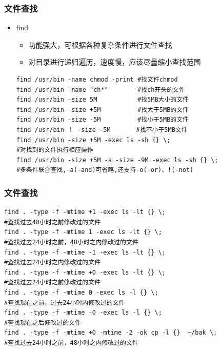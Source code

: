 \documentclass[xcolor=svgnames,presentation]{beamer}
\begin{document}
\begin{frame}[fragile]
\frametitle{文件查找}
\label{sec-1-1-7}
\begin{itemize}

\item find
\label{sec-1-1-7-1}%
\begin{itemize}

\item 功能强大，可根据各种复杂条件进行文件查找
\label{sec-1-1-7-1-1}%

\item 对目录进行递归遍历，速度慢，应该尽量缩小查找范围
\label{sec-1-1-7-1-2}%
\end{itemize} %
\label{sec-1-1-7-1-3}


\begin{verbatim}
find /usr/bin -name chmod -print #找文件chmod
find /usr/bin -name "ch*"        #找ch开头的文件
find /usr/bin -size 5M           #找5MB大小的文件
find /usr/bin -size +5M          #找大于5MB的文件
find /usr/bin -size -5M          #找小于5MB的文件
find /usr/bin ！ -size -5M       #找不小于5MB文件
find /usr/bin -size +5M -exec ls -sh {} \; 
#对找到的文件执行相应操作
find /usr/bin -size +5M -a -size -9M -exec ls -sh {} \; 
#多条件联合查找,-a(-and)可省略,还支持-o(-or)、!(-not)
\end{verbatim}
\end{itemize} %
\end{frame}
\begin{frame}[fragile]
\frametitle{文件查找}
\label{sec-1-1-8}
\label{sec-1-1-8-1}


\begin{verbatim}
find . -type -f -mtime +1 -exec ls -lt {} \; 
#查找过去48小时之前修改过的文件
find . -type -f -mtime 1 -exec ls -lt {} \;  
#查找过去24小时之前，48小时之内修改过的文件
find . -type -f -mtime -1 -exec ls -lt {} \; 
#查找过去24小时之内修改过的文件
find . -type -f -mtime +0 -exec ls -lt {} \; 
#查找过去24小时之前修改过的文件
find . -type -f -mtime 0 -exec ls -l {} \;   
#查找现在之前，过去24小时内修改过的文件
find . -type -f -mtime -0 -exec ls -l {} \;  
#查找现在之后修改过的文件
find . -type -f -mtime +0 -mtime -2 -ok cp -l {}  ~/bak \; 
#查找过去24小时之前，48小时之内修改过的文件
\end{verbatim}
\end{frame}
\end{document}
